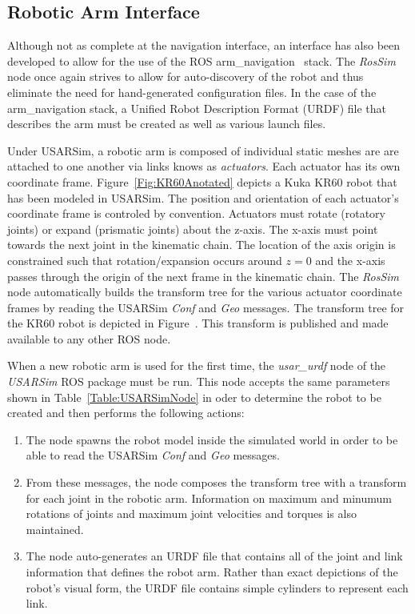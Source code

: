 \subsection*{Robotic Arm Interface}
Although not as complete at the navigation interface, an interface has also been developed to allow for the use of the ROS arm\_navigation~\cite{RosArmNavWeb} stack. The {\it RosSim} node once again strives to allow for auto-discovery of the robot and thus eliminate the need for hand-generated configuration files. In the case of the arm\_navigation stack, a Unified Robot Description Format (URDF) file that describes the arm must be created as well as various launch files. 

Under USARSim, a robotic arm is composed of individual static meshes are are attached to one another via  links knows as {\it actuators}. Each actuator has its own coordinate frame. Figure~\ref{Fig:KR60Anotated} depicts a Kuka KR60 robot that has been modeled in USARSim. The position and orientation of each actuator's coordinate frame is controled by convention. Actuators must rotate (rotatory joints) or expand (prismatic joints) about the z-axis. The x-axis must point towards the next joint in the kinematic chain. The location of the axis origin is constrained such that rotation/expansion occurs around $z=0$ and the x-axis passes through the origin of the next frame in the kinematic chain. The {\it RosSim} node automatically builds the transform tree for the various actuator coordinate frames by reading the USARSim {\it Conf} and {\it Geo} messages. The transform tree for the KR60 robot is depicted in Figure~\cite{Fig:KR60TF}. This transform is published and made available to any other ROS node.

When a new robotic arm is used for the first time, the {\it usar\_urdf} node of the {\it USARSim} ROS package must be run. This node accepts the same parameters shown in Table~\ref{Table:USARSimNode} in oder to determine the robot to be created and then performs the following actions:
\begin{enumerate}
\item The node spawns the robot model inside the simulated world in order to be able to read the USARSim  {\it Conf} and {\it Geo} messages.
\item From these messages, the node composes the transform tree with a transform for each joint in the robotic arm. Information on maximum and minumum rotations of joints and maximum joint velocities and torques is also maintained.
\item The node auto-generates an URDF file that contains all of the joint and link information that defines the robot arm. Rather than exact depictions of the robot's visual form, the URDF file contains simple cylinders to represent each link.
\end{enumerate}

